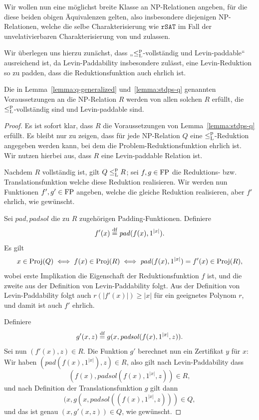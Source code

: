 Wir wollen nun eine möglichst breite Klasse an NP-Relationen angeben, für die diese beiden obigen Äquivalenzen gelten, also insbesondere diejenigen NP-Relationen, welche die selbe Charakterisierung wie $\mathtt{rSAT}$ im Fall der unvelativierbaren Charakterisierung von \citeauthor{fenner_inverting_2003} und \citeauthor{messner_simulation_2001} zulassen.

Wir überlegen uns hierzu zunächst, dass „$\leq_\mathrm{L}^\mathrm{p}$-vollständig und Levin-paddable“ ausreichend ist, da Levin-Paddability insbesondere zulässt, eine Levin-Reduktion so zu padden, dass die Reduktionsfunktion auch ehrlich ist.
\begin{lemma}
    Die in Lemma~\ref{lemma:q-generalized} und~\ref{lemma:stdps-q} genannten Voraussetzungen an die NP-Relation $R$ werden von allen solchen $R$ erfüllt, die $\leq_\mathrm{L}^\mathrm{p}$-vollständig sind und Levin-paddable sind.
\end{lemma}
\begin{proof}
    Es ist sofort klar, dass $R$ die Voraussetzungen von Lemma~\ref{lemma:stdps-q} erfüllt.
    Es bleibt nur zu zeigen, dass für jede NP-Relation $Q$ eine $\leq_\mathrm{L}^\mathrm{p}$-Reduktion angegeben werden kann, bei dem die Problem-Reduktionsfunktion ehrlich ist.
    Wir nutzen hierbei aus, dass $R$ eine Levin-paddable Relation ist.

    Nachdem $R$ vollständig ist, gilt $Q\leq_\mathrm{L}^\mathrm{p} R$; sei $f,g\in\mathrm{FP}$ die Reduktions- bzw. Translationsfunktion welche diese Reduktion realisieren. Wir werden nun Funktionen $f', g'\in\mathrm{FP}$ angeben, welche die gleiche Reduktion realisieren, aber $f'$ ehrlich, wie gewünscht.

    Sei $\mathit{pad}, \mathit{padsol}$ die zu $R$ zugehörigen Padding-Funktionen. Definiere
    \[ f'(x) \stackrel{\text{df}}{=}  \mathit{pad}(f(x), 1^{|x|}). \]
    Es gilt
    \[ x\in\operatorname{Proj}(Q) \iff f(x)\in \operatorname{Proj}(R) \iff \mathit{pad}(f(x), 1^{|x|})=f'(x)\in\operatorname{Proj}(R), \]
    wobei erste Implikation die Eigenschaft der Reduktionsfunktion $f$ ist, und die zweite aus der Definition von Levin-Paddability folgt.
    Aus der Definition von  Levin-Paddability folgt auch $r(|f'(x)|)\geq |x|$ für ein geeignetes Polynom $r$, und damit ist auch $f'$ ehrlich.

    Definiere
    \[ g'(x, z) \stackrel{\text{df}}{=}  g(x, \mathit{padsol}(f(x), 1^{|x|}, z)). \]
    Sei nun $(f'(x), z)\in R$. Die Funktion $g'$ berechnet nun ein Zertifikat $y$ für $x$: Wir haben $(\mathit{pad}(f(x), 1^{|x|}), z)\in R$, also gilt nach Levin-Paddability dass \[(f(x), \mathit{padsol}(f(x), 1^{|x|}, z))\in R,\] 
    und nach Definition der Translationsfunktion $g$ gilt dann
    \[(x, g(x, \mathit{padsol}((f(x), 1^{|x|}, z)))\in Q,\]
    und das ist genau $(x, g'(x, z))\in Q$, wie gewünscht.
\end{proof}

